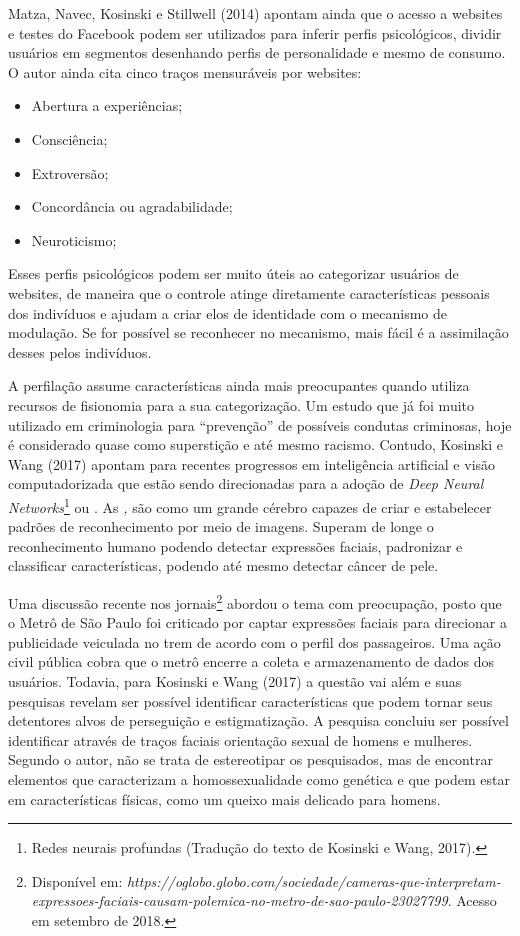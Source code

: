 Matza, Navec, Kosinski e Stillwell (2014) apontam ainda que o acesso a
websites e testes do Facebook podem ser utilizados para inferir perfis
psicológicos, dividir usuários em segmentos desenhando perfis de
personalidade e mesmo de consumo. O autor ainda cita cinco traços
mensuráveis por websites:

\begin{itemize}
\item
  Abertura a experiências;
\item
  Consciência;
\item
  Extroversão;
\item
  Concordância ou agradabilidade;
\item
  Neuroticismo;
\end{itemize}

Esses perfis psicológicos podem ser muito úteis ao categorizar usuários
de websites, de maneira que o controle atinge diretamente
características pessoais dos indivíduos e ajudam a criar elos de
identidade com o mecanismo de modulação. Se for possível se reconhecer
no mecanismo, mais fácil é a assimilação desses pelos indivíduos.

A perfilação assume características ainda mais preocupantes quando
utiliza recursos de fisionomia para a sua categorização. Um estudo que
já foi muito utilizado em criminologia para ``prevenção'' de possíveis
condutas criminosas, hoje é considerado quase como superstição e até
mesmo racismo. Contudo, Kosinski e Wang (2017) apontam para recentes
progressos em inteligência artificial e visão computadorizada que estão
sendo direcionadas para a adoção de \emph{Deep Neural
Networks}\footnote{Redes neurais profundas (Tradução do texto de
  Kosinski e Wang, 2017).} ou \emph{}. As \emph{,} são como um
grande cérebro capazes de criar e estabelecer padrões de reconhecimento
por meio de imagens. Superam de longe o reconhecimento humano podendo
detectar expressões faciais, padronizar e classificar características,
podendo até mesmo detectar câncer de pele.

Uma discussão recente nos jornais\footnote{Disponível em:
\emph{https://oglobo.globo.com/sociedade/cameras-que-interpretam-expressoes-faciais-causam-polemica-no-metro-de-sao-paulo-23027799}.
  Acesso em setembro de 2018.} abordou o tema com preocupação, posto que
o Metrô de São Paulo foi criticado por captar expressões faciais para
direcionar a publicidade veiculada no trem de acordo com o perfil dos
passageiros. Uma ação civil pública cobra que o metrô encerre a coleta e
armazenamento de dados dos usuários. Todavia, para Kosinski e Wang (2017)
a questão vai além e suas pesquisas revelam ser possível identificar
características que podem tornar seus detentores alvos de perseguição e
estigmatização. A pesquisa concluiu ser possível identificar através de
traços faciais orientação sexual de homens e mulheres. Segundo o autor,
não se trata de estereotipar os pesquisados, mas de encontrar elementos
que caracterizam a homossexualidade como genética e que podem estar em
características físicas, como um queixo mais delicado para homens.

